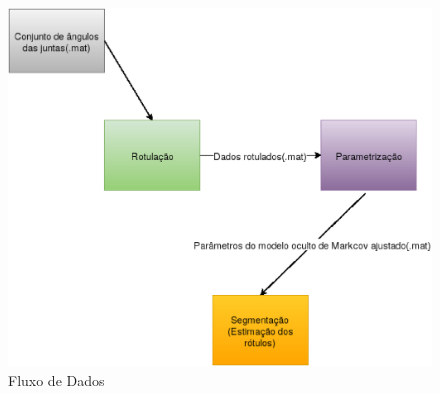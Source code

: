 \begin{figure}[!h]                                                           
\centering                                                                   
\includegraphics [keepaspectratio=true,scale=0.60]{figuras/diagramProt.eps} 
\caption{Fluxo de Dados}                                   
\label{diagramProt}                                     
                                                                             
\end{figure}                                                                 
 

